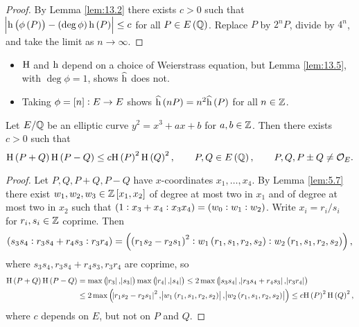 \begin{proof}
By Lemma \ref{lem:13.2} there exists $ c > 0 $ such that $ \abs{\h\br{\phi\br{P}} - \br{\deg \phi}\h\br{P}} \le c $ for all $ P \in E\br{\QQ} $. Replace $ P $ by $ 2^nP $, divide by $ 4^n $, and take the limit as $ n \to \infty $.
\end{proof}


\begin{remark*}
\hfill
\begin{itemize}
\item $ \mathrm{H} $ and $ \mathrm{h} $ depend on a choice of Weierstrass equation, but Lemma \ref{lem:13.5}, with $ \deg \phi = 1 $, shows $ \widehat{\mathrm{h}} $ does not.
\item Taking $ \phi = \sbr{n} : E \to E $ shows $ \widehat{\h}\br{nP} = n^2\widehat{\h}\br{P} $ for all $ n \in \mathbb{Z} $.
\end{itemize}
\end{remark*}

\begin{lemma}
\label{lem:13.6}
Let $ E / \mathbb{Q} $ be an elliptic curve $ y^2 = x^3 + ax + b $ for $ a, b \in \mathbb{Z} $. Then there exists $ c > 0 $ such that
$$ \H\br{P + Q}\H\br{P - Q} \le c\H\br{P}^2\H\br{Q}^2, \qquad P, Q \in E\br{\QQ}, \qquad P, Q, P \pm Q \ne \OOO_E. $$
\end{lemma}

\begin{proof}
Let $ P, Q, P + Q, P - Q $ have $ x $-coordinates $ x_1, \dots, x_4 $. By Lemma \ref{lem:5.7} there exist $ w_1, w_2, w_3 \in \ZZ\sbr{x_1, x_2} $ of degree at most two in $ x_1 $ and of degree at most two in $ x_2 $ such that $ \br{1 : x_3 + x_4 : x_3x_4} = \br{w_0 : w_1 : w_2} $. Write $ x_i = r_i / s_i $ for $ r_i, s_i \in \mathbb{Z} $ coprime. Then
$$ \br{s_3s_4 : r_3s_4 + r_4s_3 : r_3r_4} = \br{\br{r_1s_2 - r_2s_1}^2 : w_1\br{r_1, s_1, r_2, s_2} : w_2\br{r_1, s_1, r_2, s_2}}, $$
where $ s_3s_4, r_3s_4 + r_4s_3, r_3r_4 $ are coprime, so
\begin{align*}
\H\br{P + Q}\H\br{P - Q}
& = \max\br{\abs{r_3}, \abs{s_3}}\max\br{\abs{r_4}, \abs{s_4}}
\le 2\max\br{\abs{s_3s_4}, \abs{r_3s_4 + r_4s_3}, \abs{r_3r_4}} \\
& \le 2\max\br{\abs{r_1s_2 - r_2s_1}^2, \abs{w_1\br{r_1, s_1, r_2, s_2}}, \abs{w_2\br{r_1, s_1, r_2, s_2}}}
\le c\H\br{P}^2\H\br{Q}^2,
\end{align*}
where $ c $ depends on $ E $, but not on $ P $ and $ Q $.
\end{proof}

